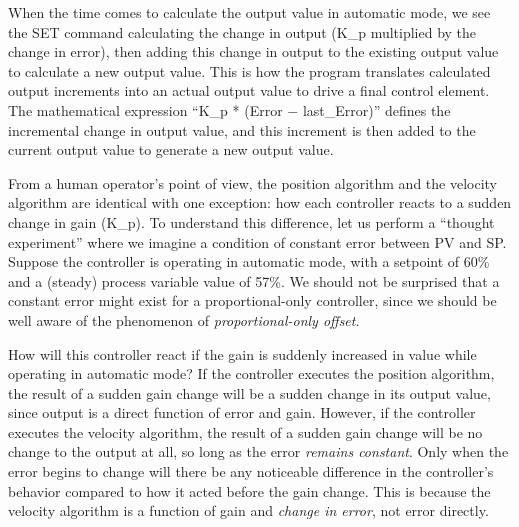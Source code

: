 When the time comes to calculate the output value in automatic mode, we see the SET command calculating the change in output (K\_p multiplied by the change in error), then adding this change in output to the existing output value to calculate a new output value.  This is how the program translates calculated output increments into an actual output value to drive a final control element.  The mathematical expression ``K\_p * (Error $-$ last\_Error)'' defines the incremental change in output value, and this increment is then added to the current output value to generate a new output value.

\vskip 10pt

From a human operator's point of view, the position algorithm and the velocity algorithm are identical with one exception: how each controller reacts to a sudden change in gain (K\_p).  To understand this difference, let us perform a ``thought experiment'' where we imagine a condition of constant error between PV and SP.  Suppose the controller is operating in automatic mode, with a setpoint of 60\% and a (steady) process variable value of 57\%.  We should not be surprised that a constant error might exist for a proportional-only controller, since we should be well aware of the phenomenon of \textit{proportional-only offset}.    

How will this controller react if the gain is suddenly increased in value while operating in automatic mode?  If the controller executes the position algorithm, the result of a sudden gain change will be a sudden change in its output value, since output is a direct function of error and gain.  However, if the controller executes the velocity algorithm, the result of a sudden gain change will be no change to the output at all, so long as the error \textit{remains constant}.  Only when the error begins to change will there be any noticeable difference in the controller's behavior compared to how it acted before the gain change.  This is because the velocity algorithm is a function of gain and \textit{change in error}, not error directly.

